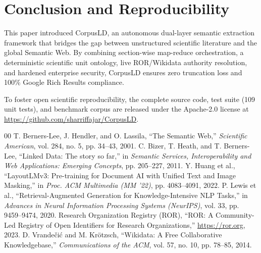 \documentclass[conference]{IEEEtran}
\begin{document}
\section{Conclusion and Reproducibility}

This paper introduced CorpusLD, an autonomous dual-layer semantic extraction framework that bridges the gap between unstructured scientific literature and the global Semantic Web. By combining section-wise map-reduce orchestration, a deterministic scientific unit ontology, live ROR/Wikidata authority resolution, and hardened enterprise security, CorpusLD ensures zero truncation loss and 100\% Google Rich Results compliance. 

To foster open scientific reproducibility, the complete source code, test suite (109 unit tests), and benchmark corpus are released under the Apache-2.0 license at \url{https://github.com/sharriffajar/CorpusLD}.


\begin{thebibliography}{00}
 T. Berners-Lee, J. Hendler, and O. Lassila, ``The Semantic Web,'' \textit{Scientific American}, vol. 284, no. 5, pp. 34--43, 2001.
 C. Bizer, T. Heath, and T. Berners-Lee, ``Linked Data: The story so far,'' in \textit{Semantic Services, Interoperability and Web Applications: Emerging Concepts}, pp. 205--227, 2011.
 Y. Huang et al., ``LayoutLMv3: Pre-training for Document AI with Unified Text and Image Masking,'' in \textit{Proc. ACM Multimedia (MM '22)}, pp. 4083--4091, 2022.
 P. Lewis et al., ``Retrieval-Augmented Generation for Knowledge-Intensive NLP Tasks,'' in \textit{Advances in Neural Information Processing Systems (NeurIPS)}, vol. 33, pp. 9459--9474, 2020.
 Research Organization Registry (ROR), ``ROR: A Community-Led Registry of Open Identifiers for Research Organizations,'' \url{https://ror.org}, 2023.
 D. Vrande\v{c}i\'{c} and M. Kr\"{o}tzsch, ``Wikidata: A Free Collaborative Knowledgebase,'' \textit{Communications of the ACM}, vol. 57, no. 10, pp. 78--85, 2014.
\end{thebibliography}
\end{document}
